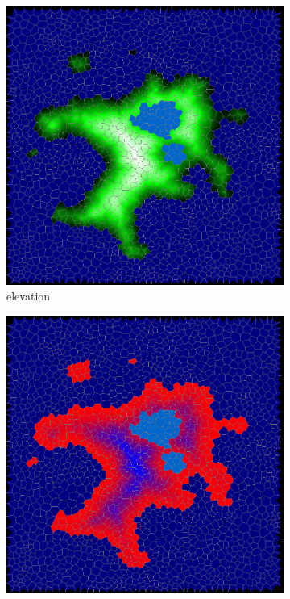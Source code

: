 \documentclass[journal, letterpaper]{IEEEtran}
\begin{document}
\begin{figure}
\begin{subfigure}[b]{0.3\textwidth}
		\includegraphics[width=\textwidth]{images/elevation2}
		\caption{elevation}
		\label{fig:elevation}
	\end{subfigure}
	\begin{subfigure}[b]{0.3\textwidth}
		\includegraphics[width=\textwidth]{images/temperature}

\end{subfigure}
\end{figure}
\end{document}
